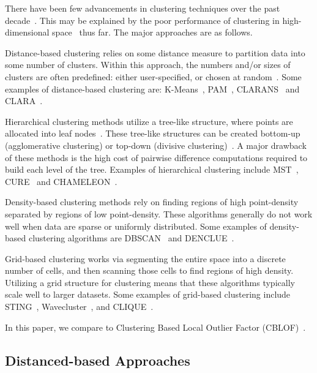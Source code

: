 There have been few advancements in clustering techniques over the past decade~\cite{wang2019progress}.
This may be explained by the poor performance of clustering in high-dimensional space~\cite{zhang2013advancements} thus far.
The major approaches are as follows.

Distance-based clustering relies on some distance measure to partition data into some number of clusters.
Within this approach, the numbers and/or sizes of clusters are often predefined: either user-specified, or chosen at random~\cite{wang2019progress}.
Some examples of distance-based clustering are:
K-Means~\cite{macqueen1967some},
PAM~\cite{kaufman2009finding},
CLARANS~\cite{ng1994efficient} and
CLARA~\cite{kaufman2009finding}.

Hierarchical clustering methods utilize a tree-like structure, where points are allocated into leaf nodes~\cite{wang2019progress}.
These tree-like structures can be created bottom-up (agglomerative clustering) or top-down (divisive clustering)~\cite{agrawal1998automatic}.
A major drawback of these methods is the high cost of pairwise difference computations required to build each level of the tree.
Examples of hierarchical clustering include
MST~\cite{charles_zahn_graph_1971},
CURE~\cite{guha1998cure} and
CHAMELEON~\cite{karypis1999hierarchical}.

Density-based clustering methods rely on finding regions of high point-density separated by regions of low point-density.
These algorithms generally do not work well when data are sparse or uniformly distributed.
Some examples of density-based clustering algorithms are
DBSCAN~\cite{ester1996density} and
DENCLUE~\cite{hinneburg1998efficient}.

Grid-based clustering works via segmenting the entire space into a discrete number of cells, and then scanning those cells to find regions of high density.
Utilizing a grid structure for clustering means that these algorithms typically scale well to larger datasets.
Some examples of grid-based clustering include
STING~\cite{wang1997sting},
Wavecluster~\cite{sheikholeslami2000wavecluster}, and
CLIQUE~\cite{agrawal1998automatic}.

In this paper, we compare to Clustering Based Local Outlier Factor (CBLOF)~\cite{he2003cblof}.


\subsection{Distanced-based Approaches}
\label{subsec:related-works:distanced-based-approaches}

